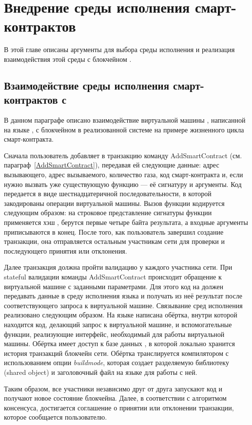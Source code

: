 \section{Внедрение среды исполнения смарт-кон\-трак\-тов}
В этой главе описаны аргументы для выбора среды исполнения и реализация взаимодействия этой среды с блокчейном .

\subsection{Взаимодействие среды исполнения смарт-кон\-трак\-тов с }
В данном параграфе описано взаимодействие виртуальной машины , написанной на языке , с блокчейном  в реализованной системе на примере жизненного цикла смарт-контракта.

Сначала пользователь добавляет в транзакцию команду Add\-Smart\-Con\-tract (см. параграф~\ref{AddSmartContract}), передавая ей следующие данные: адрес вызывающего, адрес вызываемого, количество газа, код смарт-кон\-тракта и, если нужно вызвать уже существующую функцию --- её сигнатуру и аргументы.
Код передается в виде шестнадцатеричной последовательности, в которой закодированы  операции виртуальной машины.
Вызов функции кодируется следующим образом: на строковое представление сигнатуры функции применяется хэш , берутся первые четыре байта результата, а входные аргументы приписываются в конец.
После того, как пользователь завершил создание транзакции, она отправляется остальным участникам сети для проверки и последующего принятия или отклонения.

Далее транзакция должна пройти валидацию у каждого участника сети.
При stateful валидации команды Add\-Smart\-Con\-tract происходит обращение к виртуальной машине  с заданными параметрами.
Для этого код на  должен передавать данные в среду исполнения языка  и получать из неё результат после соответствующего запроса к виртуальной машине.
Связывание сред исполнения реализовано следующим образом.
На языке  написана обёртка, внутри которой находится код, делающий запрос к  виртуальной машине, и вспомогательные функции, реализующие интерфейс, необходимый для работы виртуальной машины.
Обёртка имеет доступ к базе данных , в которой локально хранится история транзакций блокчейн сети.
Обёртка транслируется компилятором  с использованием опции \emph{buildmode}, которая создает разделяемую библиотеку (shared object) и заголовочный файл на языке  для работы с ней.

Таким образом, все участники независимо друг от друга запускают код и получают новое состояние блокчейна.
Далее, в соответствии с алгоритмом консенсуса, достигается соглашение о принятии или отклонении транзакции, которое сообщается пользователю.
